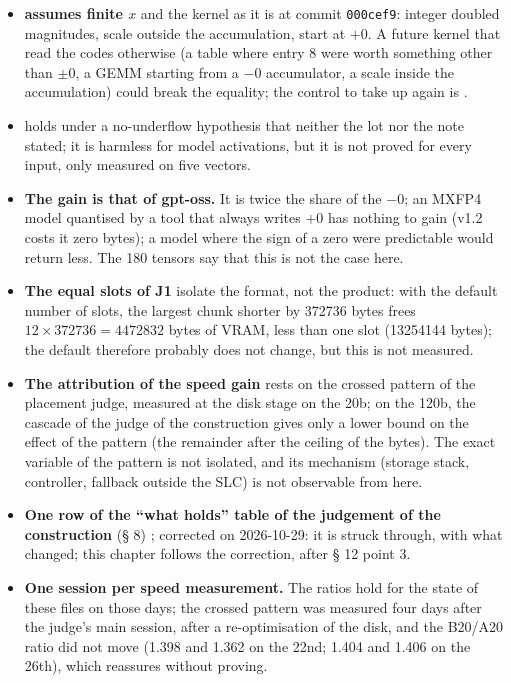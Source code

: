 \begin{faux}
\begin{itemize}
\item \textbf{ assumes finite $x$} and the kernel as it is at commit \texttt{000cef9}: integer doubled magnitudes, scale outside the accumulation, start at $+0$. A future kernel that read the codes otherwise (a table where entry 8 were worth something other than $\pm 0$, a GEMM starting from a $-0$ accumulator, a scale inside the accumulation) could break the equality; the control to take up again is .
\item \textbf{} holds under a no-underflow hypothesis that neither the lot nor the note stated; it is harmless for model activations, but it is not proved for every input, only measured on five vectors.
\item \textbf{The gain is that of gpt-oss.} It is twice the share of the $-0$; an MXFP4 model quantised by a tool that always writes $+0$ has nothing to gain (v1.2 costs it zero bytes); a model where the sign of a zero were predictable would return less. The 180 tensors say that this is not the case here.
\item \textbf{The equal slots of J1} isolate the format, not the product: with the default number of slots, the largest chunk shorter by \num{372736} bytes frees $12 \times \num{372736} = \num{4472832}$ bytes of VRAM, less than one slot (\num{13254144} bytes); the default therefore probably does not change, but this is not measured.
\item \textbf{The attribution of the speed gain} rests on the crossed pattern of the placement judge, measured at the disk stage on the 20b; on the 120b, the cascade of the judge of the construction gives only a lower bound on the effect of the pattern (the remainder after the ceiling of the bytes). The exact variable of the pattern is not isolated, and its mechanism (storage stack, controller, fallback outside the SLC) is not observable from here.
\item \textbf{One row of the ``what holds'' table of the judgement of the construction} (§ 8) ; corrected on 2026-10-29: it is struck through, with what changed; this chapter follows the correction, after  § 12 point 3.
\item \textbf{One session per speed measurement.} The ratios hold for the state of these files on those days; the crossed pattern was measured four days after the judge's main session, after a re-optimisation of the disk, and the B20/A20 ratio did not move (1.398 and 1.362 on the 22nd; 1.404 and 1.406 on the 26th), which reassures without proving.

\end{itemize}
\end{faux}

